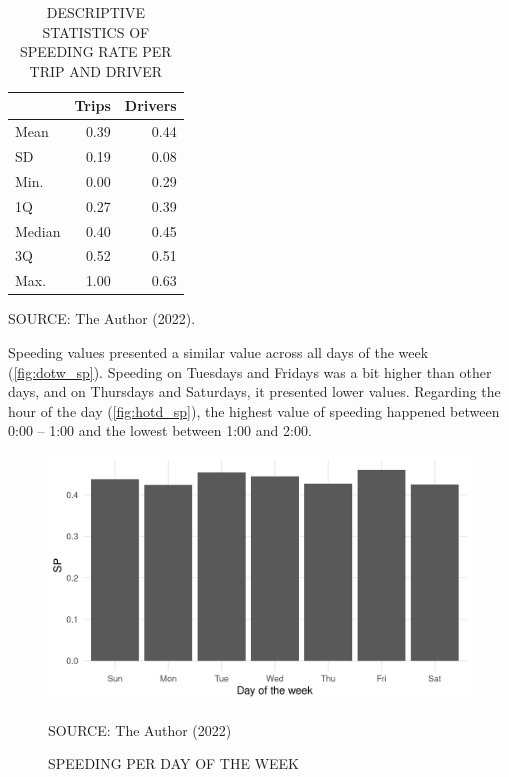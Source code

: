 \begin{table}[!htbp]
    \footnotesize
    \captionsetup{justification=raggedright,
        singlelinecheck=false,
        font=footnotesize}
    \caption{DESCRIPTIVE STATISTICS OF SPEEDING RATE PER TRIP AND DRIVER}
    \centering
    \begin{tabular}{lrr}
        \hline
         & \multicolumn{1}{c}{\textbf{Trips}} & \multicolumn{1}{c}{\textbf{Drivers}} \\
        \hline
        Mean   &     0.39 & 0.44 \\
        SD     &     0.19 & 0.08 \\
        Min.   &     0.00 & 0.29 \\
        1Q     &     0.27 & 0.39 \\
        Median &     0.40 & 0.45 \\
        3Q     &     0.52 & 0.51 \\
        Max.   &     1.00 & 0.63 \\
        \hline
    \end{tabular}
    \label{tab:speeding}
    \par \vspace{2mm} \footnotesize \raggedright
    SOURCE: The Author (2022).
\end{table}


Speeding values presented a similar value across all days of the week (\autoref{fig:dotw_sp}). Speeding on Tuesdays and Fridays was a bit higher than other days, and on Thursdays and Saturdays, it presented lower values. Regarding the hour of the day (\autoref{fig:hotd_sp}), the highest value of speeding happened between 0:00 – 1:00 and the lowest between 1:00 and 2:00. 

\begin{figure}[!htbp]
    \centering\footnotesize
    \captionsetup{font=footnotesize}
    \caption{SPEEDING PER DAY OF THE WEEK}
    \includegraphics{fig/dotw_sp.png}
    \label{fig:dotw_sp}
    \par SOURCE: The Author (2022)
\end{figure}

